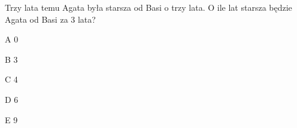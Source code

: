 \begin{tresc}
Trzy lata temu Agata była starsza od Basi o trzy lata. O ile lat starsza będzie Agata od Basi za 3 lata?
\end{tresc}
\begin{wariant}{A} 0 \end{wariant}
\begin{wariant}{B} 3 \end{wariant}
\begin{wariant}{C} 4 \end{wariant}
\begin{wariant}{D} 6 \end{wariant}
\begin{wariant}{E} 9 \end{wariant}
